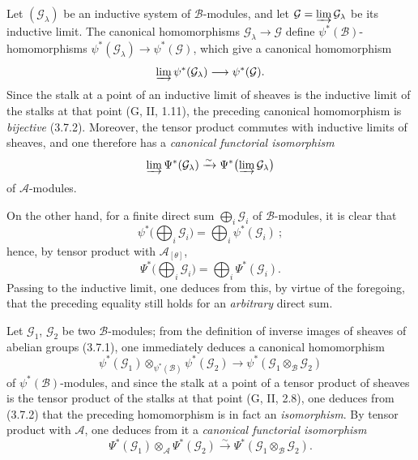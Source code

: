 \begin{env}[4.3.2]
\label{0.4.3.2}
Let $(\mathcal{G}_\lambda)$ be an inductive system of $\mathcal{B}$-modules, and
let $\mathcal{G}=\varinjlim\mathcal{G}_\lambda$ be its inductive limit. The
canonical homomorphisms $\mathcal{G}_\lambda\to\mathcal{G}$ define
$\psi^*(\mathcal{B})$-homomorphisms
$\psi^*(\mathcal{G}_\lambda)\to\psi^*(\mathcal{G})$, which give a
canonical homomorphism
\[
  \varinjlim\psi^*(\mathcal{G}_\lambda)
  \longrightarrow
  \psi^*(\mathcal{G}).
\]
Since the stalk at a point of an inductive limit of sheaves is the
inductive limit of the stalks at that point (G, II, 1.11), the preceding
canonical homomorphism is \emph{bijective} (3.7.2). Moreover, the tensor product commutes
with inductive limits of sheaves, and one therefore has a \emph{canonical
functorial isomorphism}
\[
  \varinjlim\Psi^*(\mathcal{G}_\lambda)
  \xrightarrow{\sim}
  \Psi^*\bigl(\varinjlim\mathcal{G}_\lambda\bigr)
\]
of $\mathcal{A}$-modules.

On the other hand, for a finite direct sum $\bigoplus_i\mathcal{G}_i$ of
$\mathcal{B}$-modules, it is clear that
\[
  \psi^*\bigl(\bigoplus_i\mathcal{G}_i\bigr)
  =\bigoplus_i\psi^*(\mathcal{G}_i)~;
\]
hence, by tensor product with $\mathcal{A}_{[\theta]}$,
\[
  \Psi^*\bigl(\bigoplus_i\mathcal{G}_i\bigr)
  =\bigoplus_i\Psi^*(\mathcal{G}_i).
  \tag{4.3.2.1}\label{0.4.3.2.1}
\]
Passing to the inductive limit, one deduces from this, by virtue of the foregoing,
that the preceding equality still holds for an \emph{arbitrary}
direct sum.
\end{env}

\begin{env}[4.3.3]\label{0.4.3.3}
Let $\mathcal{G}_1$, $\mathcal{G}_2$ be two $\mathcal{B}$-modules; from the
definition of inverse images of sheaves of abelian groups (3.7.1),
one immediately deduces a canonical homomorphism
\[
  \psi^*(\mathcal{G}_1)\otimes_{\psi^*(\mathcal{B})}\psi^*(\mathcal{G}_2)
  \longrightarrow
  \psi^*(\mathcal{G}_1\otimes_{\mathcal{B}}\mathcal{G}_2)
\]
of $\psi^*(\mathcal{B})$-modules, and since the stalk at a point of a
tensor product of sheaves is the tensor product of the stalks at that point
(G, II, 2.8), one deduces from (3.7.2) that the preceding homomorphism is in fact
an \emph{isomorphism}. By tensor product with $\mathcal{A}$, one deduces from it
a \emph{canonical functorial isomorphism}
\[
  \Psi^*(\mathcal{G}_1)\otimes_{\mathcal{A}}\Psi^*(\mathcal{G}_2)
  \xrightarrow{\sim}
  \Psi^*(\mathcal{G}_1\otimes_{\mathcal{B}}\mathcal{G}_2).
  \tag{4.3.3.1}\label{0.4.3.3.1}
\]
\end{env}

